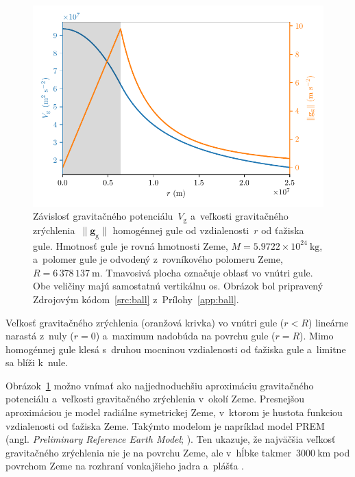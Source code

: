 \documentclass[a4paper, 12pt]{book}
\newcommand{\gidx}{\mathrm g}
\let\vec\mathbf
\begin{document}
\begin{figure}[bt]
\centering
\includegraphics{./fig-homogeneous-ball-vg-gg.pdf}
\caption{Závislosť gravitačného potenciálu~$V_\gidx$ a~veľkosti gravitačného 
zrýchlenia~$\| \vec g_\gidx \|$ homogénnej gule od vzdialenosti~$r$ od ťažiska 
gule.  Hmotnosť gule je rovná hmotnosti Zeme, $M = 5.9722 \times 10^{24} 
\ \mathrm{kg}$, a~polomer gule je odvodený z~rovníkového polomeru Zeme, $R 
= 6\,378\,137\ \mathrm{m}$.  Tmavosivá plocha označuje oblasť vo vnútri gule.  
Obe veličiny majú samostatnú vertikálnu os.  Obrázok bol pripravený Zdrojovým 
kódom~\ref{src:ball} z~Prílohy~\ref{app:ball}.}
\label{fig:homogeneous_ball_plot}
\end{figure}

Veľkosť gravitačného zrýchlenia (oranžová krivka) vo vnútri gule ($r < R$) 
lineárne narastá z~nuly ($r = 0$) a~maximum nadobúda na povrchu gule ($r = R$).  
Mimo homogénnej gule klesá s~druhou mocninou vzdialenosti od ťažiska gule 
a~limitne sa blíži k~nule.

Obrázok~\ref{fig:homogeneous_ball_plot} možno vnímať ako najjednoduchšiu 
aproximáciu gravitačného potenciálu a~veľkosti gravitačného zrýchlenia v~okolí 
Zeme.  Presnejšou aproximáciou je model radiálne symetrickej Zeme, v~ktorom je 
hustota funkciou vzdialenosti od ťažiska Zeme.  Takýmto modelom je napríklad 
model PREM (angl. \emph{Preliminary Reference Earth Model}; 
\cite{Dziewonski1981}).  Ten ukazuje, že najväčšia veľkosť gravitačného 
zrýchlenia nie je na povrchu Zeme, ale v~hĺbke takmer~$3000\ \mathrm{km}$ pod 
povrchom Zeme na rozhraní vonkajšieho jadra a~plášťa \parencite[pozri 
napríklad][]{TorgeGeodesy,Lowrie2007}.
\end{document}
